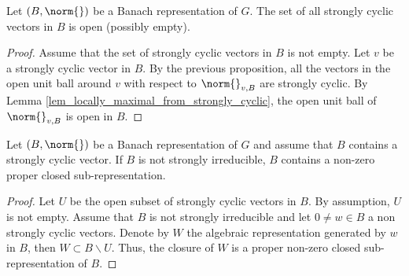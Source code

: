 \begin{comment}-------------------------------------------------------------------------
\begin{prop}
Let $V$ be a cyclic representation of $V$, $v\in V$ a cyclic vector.
Assume that $\Norms(V)^G$ is not empty and let $\Ucomp{V}$ be the universal completion of $V$.
Then any vector $w\in \Ucomp{V}$ with $\norm{w-v}_v<1$ is strongly cyclic in $\Ucomp{V}$.
\end{prop} 
        \begin{proof}
        By Theorem \ref{thm_strongly_cyclic_spaces} it is enough to show that $\norm{}_v$ is locally maximal at $w$.
        Let $\norm{}$ be a $G$-invariant norm on $\Ucomp{V}$ that is normalized at $w$ and dominated by $\norm{}_v$.
        By assumption, $w$ can be written as
        \[w=v+\sum_{e\neq g\in G}\lambda_g\cdot g(v)\]
        where $(\lambda_g)_{g\in G}$ is summable and $\abs{\lambda_g}_p<1$ for any $g$.
        By the strong triangle inequality, $\norm{w}=\norm{v}$, so $\norm{v}=1$.
        The same argument shows that $\norm{}_v$ is normalized at $w$.
        Since $\norm{}_v$ is locally maximal at $v$, $\norm{}\leq \norm{}_v$.
        This proves that $\norm{}_v$ is also locally maximal at $w$.
        \end{proof} 
-------------------------------------------------------------------------------------\end{comment}

\begin{prop}
Let $(B,\norm{})$ be a Banach representation of $G$.
The set of all strongly cyclic vectors in $B$ is open (possibly empty).
\end{prop} 
    \begin{proof}
    Assume that the set of strongly cyclic vectors in $B$ is not empty.
    Let $v$ be a strongly cyclic vector in $B$.
    By the previous proposition, all the vectors in the open unit ball around $v$ with respect to $\norm{}_{v,B}$ are strongly cyclic.
    By Lemma \ref{lem_locally_maximal_from_strongly_cyclic}, the open unit ball of $\norm{}_{v,B}$ is open in $B$.
    \end{proof} 
    
\begin{cor}\label{cor_proper_subspaces}
Let $(B,\norm{})$ be a Banach representation of $G$ and assume that $B$ contains a strongly cyclic vector.
If $B$ is not strongly irreducible, $B$ contains a non-zero proper closed sub-representation.
\end{cor} 
    \begin{proof}
    Let $U$ be the open subset of strongly cyclic vectors in $B$.
    By assumption, $U$ is not empty.
    Assume that $B$ is not strongly irreducible and let $0\neq w\in B$ a non strongly cyclic vectors.
    Denote by $W$ the algebraic representation generated by $w$ in $B$, then $W\subset B\backslash U$.
    Thus, the closure of $W$ is a proper non-zero closed sub-representation of $B$.
    \end{proof} 


